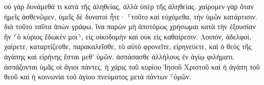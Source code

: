 \documentclass{openreader}
\begin{document}
οὐ γὰρ δυνάμεθά τι κατὰ τῆς ἀληθείας, ἀλλὰ ὑπὲρ τῆς ἀληθείας. 
χαίρομεν γὰρ ὅταν ἡμεῖς ἀσθενῶμεν, ὑμεῖς δὲ δυνατοὶ ἦτε· ⸀τοῦτο καὶ εὐχόμεθα, τὴν ὑμῶν κατάρτισιν. 
διὰ τοῦτο ταῦτα ἀπὼν γράφω, ἵνα παρὼν μὴ ἀποτόμως χρήσωμαι κατὰ τὴν ἐξουσίαν ἣν ⸂ὁ κύριος ἔδωκέν μοι⸃, εἰς οἰκοδομὴν καὶ οὐκ εἰς καθαίρεσιν. 
Λοιπόν, ἀδελφοί, χαίρετε, καταρτίζεσθε, παρακαλεῖσθε, τὸ αὐτὸ φρονεῖτε, εἰρηνεύετε, καὶ ὁ θεὸς τῆς ἀγάπης καὶ εἰρήνης ἔσται μεθ’ ὑμῶν. 
ἀσπάσασθε ἀλλήλους ἐν ἁγίῳ φιλήματι. ἀσπάζονται ὑμᾶς οἱ ἅγιοι πάντες. 
ἡ χάρις τοῦ κυρίου Ἰησοῦ Χριστοῦ καὶ ἡ ἀγάπη τοῦ θεοῦ καὶ ἡ κοινωνία τοῦ ἁγίου πνεύματος μετὰ πάντων ⸀ὑμῶν. 
\end{document}
